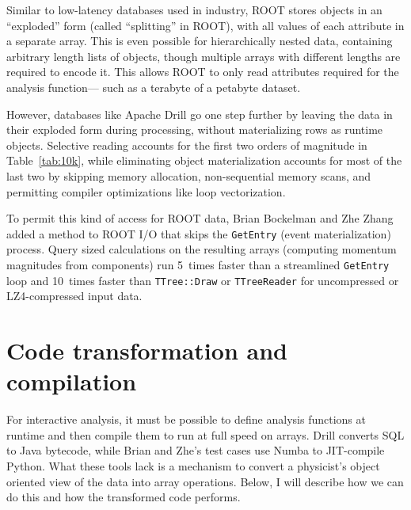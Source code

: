 \documentclass[a4paper]{jpconf}
\begin{document}
Similar to low-latency databases used in industry, ROOT stores objects in an ``exploded'' form (called ``splitting'' in ROOT), with all values of each attribute in a separate array. This is even possible for hierarchically nested data, containing arbitrary length lists of objects, though multiple arrays with different lengths are required to encode it. This allows ROOT to only read attributes required for the analysis function--- such as a terabyte of a petabyte dataset.

However, databases like Apache Drill go one step further by leaving the data in their exploded form during processing, without materializing rows as runtime objects\cite{drill}. Selective reading accounts for the first two orders of magnitude in Table~\ref{tab:10k}, while eliminating object materialization accounts for most of the last two by skipping memory allocation, non-sequential memory scans, and permitting compiler optimizations like loop vectorization.

To permit this kind of access for ROOT data, Brian Bockelman and Zhe Zhang added a method to ROOT I/O that skips the {\tt GetEntry} (event materialization) process\cite{bulkio}. Query sized calculations on the resulting arrays (computing momentum magnitudes from components) run 5~times faster than a streamlined {\tt GetEntry} loop and 10~times faster than {\tt TTree::Draw} or {\tt TTreeReader} for uncompressed or LZ4-compressed input data.

\section{Code transformation and compilation}

For interactive analysis, it must be possible to define analysis functions at runtime and then compile them to run at full speed on arrays. Drill converts SQL to Java bytecode\cite{drill}, while Brian and Zhe's test cases use Numba to JIT-compile Python\cite{bulkio}. What these tools lack is a mechanism to convert a physicist's object oriented view of the data into array operations. Below, I will describe how we can do this and how the transformed code performs.
\end{document}
